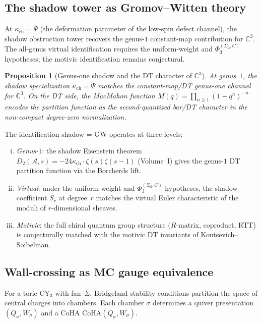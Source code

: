 \documentclass[11pt]{article}
\theoremstyle{plain}
\newtheorem{proposition}[theorem]{Proposition}
\theoremstyle{definition}
\theoremstyle{remark}
\newcommand{\cA}{\mathcal{A}}
\newcommand{\bC}{\mathbb{C}}
\newcommand{\CoHA}{\mathrm{CoHA}}
\begin{document}
\subsection{The shadow tower as Gromov--Witten theory}

At $\kappa_{\mathrm{ch}} = \Psi$ (the deformation parameter of the
low-spin defect channel), the shadow obstruction tower recovers the
genus-$1$ constant-map contribution for $\bC^3$. The all-genus virtual
identification requires the uniform-weight and $\Phi_3^{(\Sigma_2,C)}$ hypotheses;
the motivic identification remains conjectural.

\begin{proposition}[Genus-one shadow and the DT character of $\bC^3$]
\label{prop:v3-qg-shadow-gw}
At genus~$1$, the shadow specialization $\kappa_{\mathrm{ch}}=\Psi$
matches the constant-map/DT genus-one channel for $\bC^3$. On the DT
side, the MacMahon function
$M(q) = \prod_{n \geq 1}(1 - q^n)^{-n}$ encodes the partition
function as the second-quantized bar/DT character in the non-compact
degree-zero normalization.
\end{proposition}

The identification shadow = GW operates at three levels:
\begin{enumerate}[(i)]
 \item \emph{Genus-$1$}: the shadow Eisenstein theorem
 $D_2(\cA, s) = -24\kappa_{\mathrm{ch}} \cdot \zeta(s)\zeta(s-1)$
 (Volume~I) gives the genus-$1$ DT partition function via the
 Borcherds lift.
 \item \emph{Virtual}: under the uniform-weight and $\Phi_3^{(\Sigma_2,C)}$
 hypotheses, the shadow coefficient $S_r$ at degree~$r$ matches the
 virtual Euler characteristic of the moduli of $r$-dimensional sheaves.
 \item \emph{Motivic}: the full chiral quantum group structure
 ($R$-matrix, coproduct, RTT) is conjecturally matched with the
 motivic DT invariants of Kontsevich--Soibelman.
\end{enumerate}

\subsection{Wall-crossing as MC gauge equivalence}

For a toric CY$_3$ with fan~$\Sigma$, Bridgeland stability
conditions partition the space of central charges into chambers.
Each chamber $\sigma$ determines a quiver presentation
$(Q_\sigma, W_\sigma)$ and a CoHA
$\CoHA(Q_\sigma, W_\sigma)$.
\end{document}
